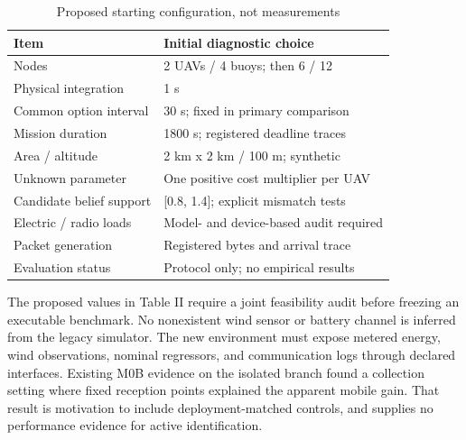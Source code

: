 \documentclass[10pt,twocolumn,letterpaper]{article}
\begin{document}
\begin{table}[t]
\centering\footnotesize
\caption{Proposed starting configuration, not measurements}
\begin{tabularx}{\columnwidth}{XX}
\toprule
Item & Initial diagnostic choice \\
\midrule
Nodes & 2 UAVs / 4 buoys; then 6 / 12 \\
Physical integration & 1 s \\
Common option interval & 30 s; fixed in primary comparison \\
Mission duration & 1800 s; registered deadline traces \\
Area / altitude & 2 km x 2 km / 100 m; synthetic \\
Unknown parameter & One positive cost multiplier per UAV \\
Candidate belief support & [0.8, 1.4]; explicit mismatch tests \\
Electric / radio loads & Model- and device-based audit required \\
Packet generation & Registered bytes and arrival trace \\
Evaluation status & Protocol only; no empirical results \\
\bottomrule
\end{tabularx}
\end{table}
The proposed values in Table II require a joint feasibility audit before freezing an executable benchmark. No nonexistent wind sensor or battery channel is inferred from the legacy simulator. The new environment must expose metered energy, wind observations, nominal regressors, and communication logs through declared interfaces. Existing M0B evidence on the isolated branch found a collection setting where fixed reception points explained the apparent mobile gain. That result is motivation to include deployment-matched controls, and supplies no performance evidence for active identification.
\end{document}
